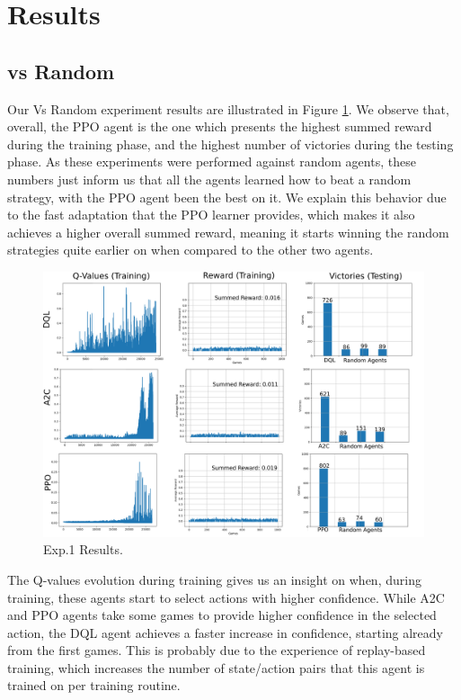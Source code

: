 \documentclass[a4paper,conference]{IEEEtran}
\begin{document}
\section{Results}
\subsection{vs Random}

Our Vs Random experiment results are illustrated in Figure \ref{fig:exp1Results}. We observe that, overall, the PPO agent is the one which presents the highest summed reward during the training phase, and the highest number of victories during the testing phase. As these experiments were performed against random agents, these numbers just inform us that all the agents learned how to beat a random strategy, with the PPO agent been the best on it. We explain this behavior due to the fast adaptation that the PPO learner provides, which makes it also achieves a higher overall summed reward, meaning it starts winning the random strategies quite earlier on when compared to the other two agents.  

\begin{figure}
    \centering
    \includegraphics[width=1.0\columnwidth]{exp1Results.png}
    \caption{Exp.1 Results.}
    \label{fig:exp1Results}
\end{figure}

The Q-values evolution during training gives us an insight on when, during training, these agents start to select actions with higher confidence. While A2C and PPO agents take some games to provide higher confidence in the selected action, the DQL agent achieves a faster increase in confidence, starting already from the first games. This is probably due to the experience of replay-based training, which increases the number of state/action pairs that this agent is trained on per training routine. 
\end{document}
